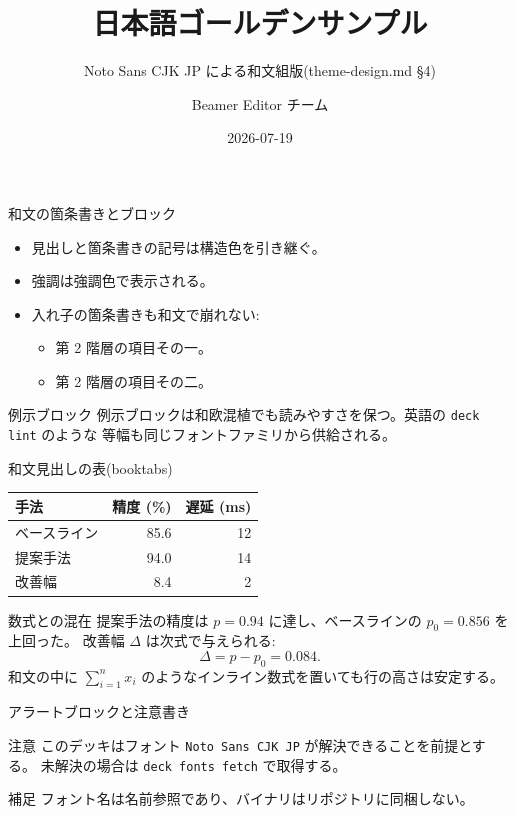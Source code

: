 \documentclass[aspectratio=169]{beamer}
\title{日本語ゴールデンサンプル}
\subtitle{Noto Sans CJK JP による和文組版(theme-design.md §4)}
\author{Beamer Editor チーム}
\date{2026-07-19}
\begin{document}
\begin{frame}
  \titlepage
\end{frame}

\begin{frame}{和文の箇条書きとブロック}
  \begin{itemize}
    \item 見出しと箇条書きの記号は構造色を引き継ぐ。
    \item \alert{強調}は強調色で表示される。
    \item 入れ子の箇条書きも和文で崩れない:
      \begin{itemize}
        \item 第 2 階層の項目その一。
        \item 第 2 階層の項目その二。
      \end{itemize}
  \end{itemize}
  \begin{exampleblock}{例示ブロック}
    例示ブロックは和欧混植でも読みやすさを保つ。英語の \texttt{deck lint} のような
    等幅も同じフォントファミリから供給される。
  \end{exampleblock}
\end{frame}

\begin{frame}{和文見出しの表(booktabs)}
  \begin{center}
    \begin{tabular}{lrr}
      \toprule
      手法 & 精度 (\%) & 遅延 (ms) \\
      \midrule
      ベースライン & 85.6 & 12 \\
      提案手法 & 94.0 & 14 \\
      改善幅 & 8.4 & 2 \\
      \bottomrule
    \end{tabular}
  \end{center}
\end{frame}

\begin{frame}{数式との混在}
  提案手法の精度は $p = 0.94$ に達し、ベースラインの $p_0 = 0.856$ を上回った。
  改善幅 $\Delta$ は次式で与えられる:
  \[
    \Delta = p - p_0 = 0.084.
  \]
  和文の中に $\sum_{i=1}^{n} x_i$ のようなインライン数式を置いても行の高さは安定する。
\end{frame}

\begin{frame}{アラートブロックと注意書き}
  \begin{alertblock}{注意}
    このデッキはフォント \texttt{Noto Sans CJK JP} が解決できることを前提とする。
    未解決の場合は \texttt{deck fonts fetch} で取得する。
  \end{alertblock}
  \begin{block}{補足}
    フォント名は名前参照であり、バイナリはリポジトリに同梱しない。
  \end{block}
\end{frame}
\end{document}
